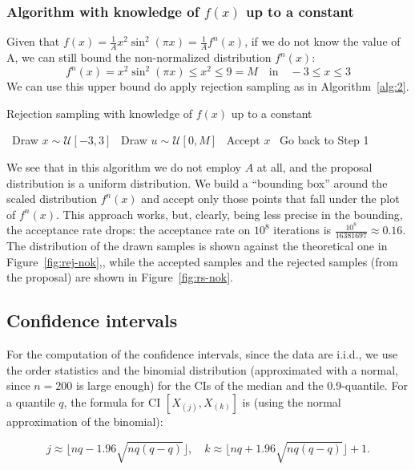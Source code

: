 \documentclass[a4paper,12pt]{article}
\begin{document}
\subsubsection*{Algorithm with knowledge of $f(x)$ up to a constant}
Given that $f(x) = \frac{1}{A}x^2\sin^2(\pi x)=\frac{1}{A}f^n(x)$, if we do not know the value of A, we can still bound the non-normalized distribution $f^{n}(x)$:
\begin{equation}
  f^n(x) = x^2\sin^2(\pi x) \leq x^2 \leq 9 = M\quad \text{in}\quad -3\leq x\leq3
\end{equation}
We can use this upper bound do apply rejection sampling as in Algorithm~\ref{alg:2}.

\begin{algorithm}
  \caption{Rejection sampling with knowledge of $f(x)$ up to a constant}\label{alg:2}
  \begin{algorithmic}[1]
    \STATE~Draw $x \sim \mathcal{U}[-3,3]$
    \STATE~Draw $u \sim \mathcal{U}[0, M]$
    \STATE~Accept $x$
    \ELSE%
    \STATE~Go back to Step 1
    \ENDIF%
  \end{algorithmic}
\end{algorithm}

We see that in this algorithm we do not employ $A$ at all, and the proposal distribution is a uniform distribution. We build a ``bounding box'' around the scaled distribution $f^n(x)$ and accept only those points that fall under the plot of $f^n(x)$. This approach works, but, clearly, being less precise in the bounding, the acceptance rate drops: the acceptance rate on $10^8$ iterations is $\frac{10^8}{16381697} \approx 0.16$. The distribution of the drawn samples is shown against the theoretical one in Figure~\ref{fig:rej-nok},, while the accepted samples and the rejected samples (from the proposal) are shown in Figure~\ref{fig:rs-nok}.

\subsection*{Confidence intervals}
For the computation of the confidence intervals, since the data are i.i.d., we use the order statistics and the binomial distribution (approximated with a normal, since $n=200$ is large enough) for the CIs of the median and the 0.9-quantile.
For a quantile $q$, the formula for CI $[X_{(j)},X_{(k)}]$ is (using the normal approximation of the binomial):

\begin{equation*}
  j \approx \lfloor nq-1.96\sqrt{nq(q-q)} \rfloor, \quad k \approx \lfloor nq+1.96\sqrt{nq(q-q)} \rfloor +1.
\end{equation*}
\end{document}
